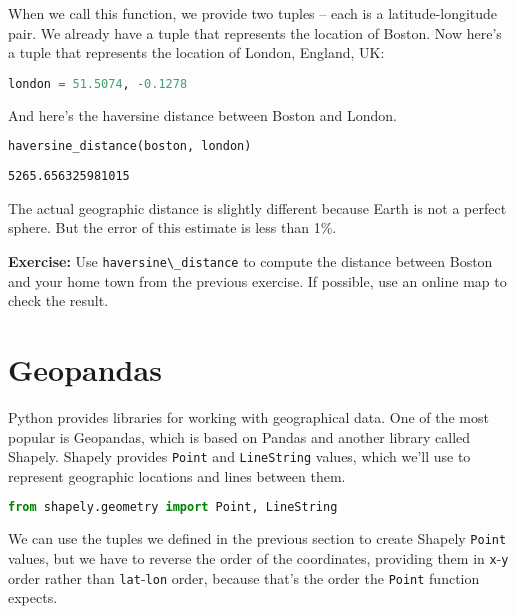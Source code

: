 When we call this function, we provide two tuples -- each is a
latitude-longitude pair. We already have a tuple that represents the
location of Boston. Now here's a tuple that represents the location of
London, England, UK:

\begin{lstlisting}[language=Python,style=source]
london = 51.5074, -0.1278
\end{lstlisting}

\pagebreak

And here's the haversine distance between Boston and London.

\begin{lstlisting}[language=Python,style=source]
haversine_distance(boston, london)
\end{lstlisting}

\begin{lstlisting}[style=output]
5265.656325981015
\end{lstlisting}

The actual geographic distance is slightly different because Earth is
not a perfect sphere. But the error of this estimate is less than 1\%.

\textbf{Exercise:} Use \passthrough{\lstinline!haversine\_distance!} to
compute the distance between Boston and your home town from the previous
exercise. If possible, use an online map to check the result.

\section{Geopandas}\label{geopandas}

Python provides libraries for working with geographical data. One of the
most popular is Geopandas, which is based on Pandas and another library
called Shapely. Shapely provides \passthrough{\lstinline!Point!} and
\passthrough{\lstinline!LineString!} values, which we'll use to
represent geographic locations and lines between them.

\begin{lstlisting}[language=Python,style=source]
from shapely.geometry import Point, LineString
\end{lstlisting}

We can use the tuples we defined in the previous section to create
Shapely \passthrough{\lstinline!Point!} values, but we have to reverse
the order of the coordinates, providing them in
\passthrough{\lstinline!x!}-\passthrough{\lstinline!y!} order rather
than \passthrough{\lstinline!lat!}-\passthrough{\lstinline!lon!} order,
because that's the order the \passthrough{\lstinline!Point!} function
expects.

